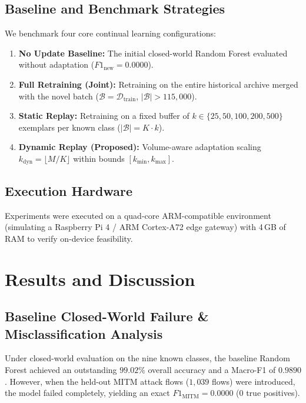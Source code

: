 \documentclass[conference]{IEEEtran}
\begin{document}
\subsection{Baseline and Benchmark Strategies}
We benchmark four core continual learning configurations:
\begin{enumerate}
    \item \textbf{No Update Baseline:} The initial closed-world Random Forest evaluated without adaptation ($F1_{\text{new}} = 0.0000$).
    \item \textbf{Full Retraining (Joint):} Retraining on the entire historical archive merged with the novel batch ($\mathcal{B} = \mathcal{D}_{\text{train}}$, $|\mathcal{B}| > 115{,}000$).
    \item \textbf{Static Replay:} Retraining on a fixed buffer of $k \in \{25, 50, 100, 200, 500\}$ exemplars per known class ($|\mathcal{B}| = K \cdot k$).
    \item \textbf{Dynamic Replay (Proposed):} Volume-aware adaptation scaling $k_{\text{dyn}} = \lfloor M/K \rfloor$ within bounds $[k_{\min}, k_{\max}]$.
\end{enumerate}

\subsection{Execution Hardware}
Experiments were executed on a quad-core ARM-compatible environment (simulating a Raspberry Pi 4 / ARM Cortex-A72 edge gateway) with 4\,GB of RAM to verify on-device feasibility.

\section{Results and Discussion}
\label{sec:results_and_discussion}

\subsection{Baseline Closed-World Failure \& Misclassification Analysis}
Under closed-world evaluation on the nine known classes, the baseline Random Forest achieved an outstanding $99.02\%$ overall accuracy and a Macro-F1 of $0.9890$. However, when the held-out MITM attack flows ($1{,}039$ flows) were introduced, the model failed completely, yielding an exact $F1_{\text{MITM}} = 0.0000$ (0 true positives).
\end{document}
